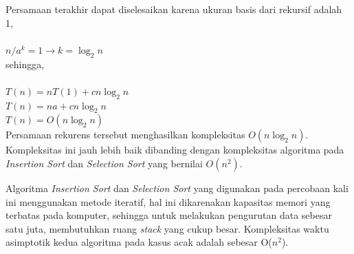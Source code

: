 \documentclass{article}
\begin{document}
	Persamaan terakhir dapat diselesaikan karena ukuran basis dari rekursif adalah 1,\\
	$ $\\
	$n/a^k = 1 \rightarrow k = \log_2 n$ \\
	
	sehingga, \\
	$ $\\
	$T(n) = nT(1) + cn \log_2 n$ \\
	$T(n) = na + cn \log_2 n$ \\
	$T(n) = O(n \log_2 n)$ \\
	
	Persamaan rekurens tersebut menghasilkan kompleksitas $O(n \log_2 n)$. Kompleksitas ini jauh lebih baik dibanding dengan kompleksitas algoritma pada \textit{Insertion Sort} dan \textit{Selection Sort} yang bernilai $O(n^2)$.
	
	\par Algoritma \textit{Insertion Sort} dan \textit{Selection Sort} yang digunakan pada percobaan kali ini menggunakan metode iteratif, hal ini dikarenakan kapasitas memori yang terbatas pada komputer, sehingga untuk melakukan pengurutan data sebesar satu juta, membutuhkan ruang \textit{stack} yang cukup besar. Kompleksitas waktu asimptotik kedua algoritma pada kasus acak adalah sebesar O($n^2$).
	
\end{document}
